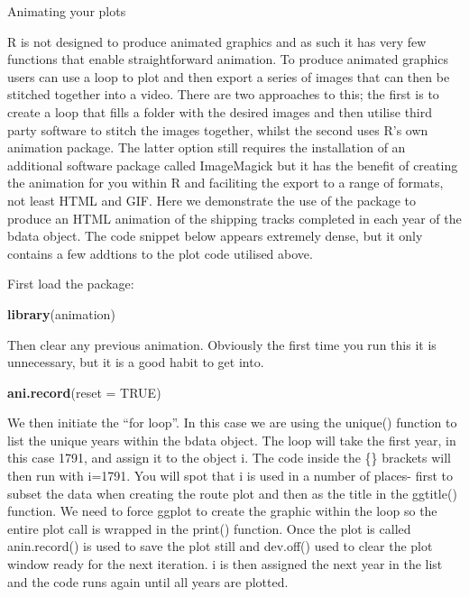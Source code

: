 \documentclass[]{article}
\newenvironment{Shaded}{}{}
\newcommand{\KeywordTok}[1]{\textcolor[rgb]{0.00,0.44,0.13}{\textbf{{#1}}}}
\newcommand{\DataTypeTok}[1]{\textcolor[rgb]{0.56,0.13,0.00}{{#1}}}
\newcommand{\OtherTok}[1]{\textcolor[rgb]{0.00,0.44,0.13}{{#1}}}
\newcommand{\NormalTok}[1]{{#1}}
\begin{document}
Animating your plots

R is not designed to produce animated graphics and as such it has very
few functions that enable straightforward animation. To produce animated
graphics users can use a loop to plot and then export a series of images
that can then be stitched together into a video. There are two
approaches to this; the first is to create a loop that fills a folder
with the desired images and then utilise third party software to stitch
the images together, whilst the second uses R's own animation package.
The latter option still requires the installation of an additional
software package called ImageMagick but it has the benefit of creating
the animation for you within R and faciliting the export to a range of
formats, not least HTML and GIF. Here we demonstrate the use of the
package to produce an HTML animation of the shipping tracks completed in
each year of the bdata object. The code snippet below appears extremely
dense, but it only contains a few addtions to the plot code utilised
above.

First load the package:

\begin{Shaded}
\begin{Highlighting}[]
\KeywordTok{library}\NormalTok{(animation)}
\end{Highlighting}
\end{Shaded}
Then clear any previous animation. Obviously the first time you run this
it is unnecessary, but it is a good habit to get into.

\begin{Shaded}
\begin{Highlighting}[]
\KeywordTok{ani.record}\NormalTok{(}\DataTypeTok{reset =} \OtherTok{TRUE}\NormalTok{)}
\end{Highlighting}
\end{Shaded}
We then initiate the ``for loop''. In this case we are using the
unique() function to list the unique years within the bdata object. The
loop will take the first year, in this case 1791, and assign it to the
object i. The code inside the \{\} brackets will then run with i=1791.
You will spot that i is used in a number of places- first to subset the
data when creating the route plot and then as the title in the ggtitle()
function. We need to force ggplot to create the graphic within the loop
so the entire plot call is wrapped in the print() function. Once the
plot is called anin.record() is used to save the plot still and
dev.off() used to clear the plot window ready for the next iteration. i
is then assigned the next year in the list and the code runs again until
all years are plotted.
\end{document}
